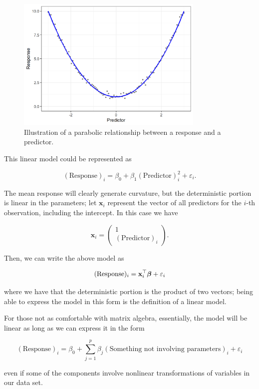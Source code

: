 \documentclass[
]{book}
\theoremstyle{plain}
\theoremstyle{mydefn}
\theoremstyle{myexmpl}
\theoremstyle{remark}
\begin{document}
\begin{figure}

{\centering \includegraphics[width=0.8\textwidth]{./Images/glm-splines-parabola-1} 

}

\caption{Illustration of a parabolic relationship between a response and a predictor.}\label{fig:glm-splines-parabola}
\end{figure}

This linear model could be represented as

\[(\text{Response})_i = \beta_0 + \beta_1 (\text{Predictor})_i^2 + \varepsilon_i.\]

The mean response will clearly generate curvature, but the deterministic portion is linear in the parameters; let \(\bm{x}_i\) represent the vector of all predictors for the \(i\)-th observation, including the intercept. In this case we have

\[\bm{x}_i = \begin{pmatrix} 1 \\ (\text{Predictor})_i \end{pmatrix}.\]

Then, we can write the above model as

\[(\text{Response})_i = \mathbf{x}_i^\top \boldsymbol{\beta} + \varepsilon_i\]

where we have that the deterministic portion is the product of two vectors; being able to express the model in this form is the definition of a linear model.

\begin{rmdtip}
For those not as comfortable with matrix algebra, essentially, the model will be linear as long as we can express it in the form

\[(\text{Response})_i = \beta_0 + \sum_{j=1}^{p} \beta_j (\text{Something not involving parameters})_i + \varepsilon_i\]

even if some of the components involve nonlinear transformations of variables in our data set.
\end{rmdtip}
\end{document}
